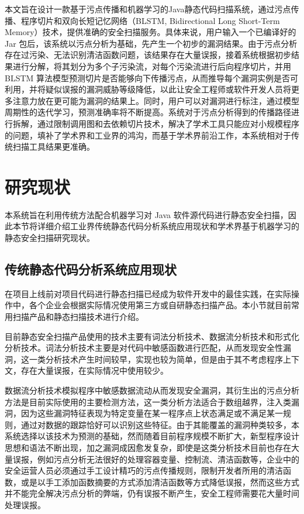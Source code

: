 本文旨在设计一款基于污点传播和机器学习的Java静态代码扫描系统，通过污点传播、程序切片和双向长短记忆网络（BLSTM, Bidirectional Long Short-Term Memory）技术，提供准确的安全扫描服务。具体来说，用户输入一个已编译好的 Jar 包后，该系统以污点分析为基础，先产生一个初步的漏洞结果。由于污点分析存在过污染、无法识别清洁函数问题，该结果存在大量误报，接着系统根据初步结果进行分解，将其划分为多个子污染流，对每个污染流进行后向程序切片，并用 BLSTM 算法模型预测切片是否能够向下传播污点，从而推导每个漏洞实例是否可利用，并将疑似误报的漏洞威胁等级降低，以此让安全工程师或软件开发人员将更多注意力放在更可能为漏洞的结果上。同时，用户可以对漏洞进行标注，通过模型周期性的迭代学习，预测准确率将不断提高。系统对于污点分析得到的传播路径进行拆解，通过限制调用图和去依赖切片技术，解决了学术工具只能应对小规模程序的问题，填补了学术界和工业界的鸿沟，而基于学术界前沿工作，本系统相对于传统扫描工具结果更准确。

\section{研究现状}
本系统旨在利用传统方法配合机器学习对 Java 软件源代码进行静态安全扫描，因此本节将详细介绍工业界传统静态代码分析系统应用现状和学术界基于机器学习的静态安全扫描研究现状。

\subsection{传统静态代码分析系统应用现状}

在项目上线前对项目代码进行静态扫描已经成为软件开发中的最佳实践，在实际操作中，各个企业会根据实际情况使用第三方或自研静态扫描产品。本小节就目前常用扫描产品和静态扫描技术进行介绍。

目前静态安全扫描产品使用的技术主要有词法分析技术、数据流分析技术和形式化分析技术。词法分析技术主要是对代码中敏感函数进行匹配，从而发现安全性漏洞，这一类分析技术产生时间较早，实现也较为简单，但是由于其不考虑程序上下文，存在大量误报，在实际情况中使用较少。

数据流分析技术模拟程序中敏感数据流动从而发现安全漏洞，其衍生出的污点分析方法是目前实际使用的主要检测方法，这一类分析方法适合于数组越界，注入类漏洞，因为这些漏洞特征表现为特定变量在某一程序点上状态满足或不满足某一规则，通过对数据的跟踪恰好可以识别这些特征。由于其能覆盖的漏洞种类较多，本系统选择以该技术为预测的基础，然而随着目前程序规模不断扩大，新型程序设计思想和语法不断出现，加之漏洞成因愈发复杂，即使是这类分析技术目前也存在大量误报，例如污点分析无法很好的处理容器变量、控制流、清洁函数等，企业中的安全运营人员必须通过手工设计精巧的污点传播规则，限制开发者所用的清洁函数，或是以手工添加函数摘要的方式添加清洁函数等方式降低误报，然而这些方式并不能完全解决污点分析的弊端，仍有误报不断产生，安全工程师需要花大量时间处理误报。
   

